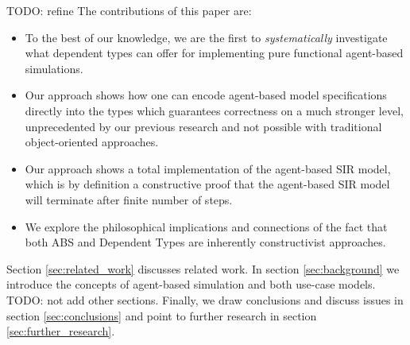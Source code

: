 TODO: refine
The contributions of this paper are:
\begin{itemize}
	\item To the best of our knowledge, we are the first to \textit{systematically} investigate what dependent types can offer for implementing pure functional agent-based simulations.
	\item Our approach shows how one can encode agent-based model specifications directly into the types which guarantees correctness on a much stronger level, unprecedented by our previous research and not possible with traditional object-oriented approaches.
	\item Our approach shows a total implementation of the agent-based SIR model, which is by definition a constructive proof that the agent-based SIR model will terminate after finite number of steps.
	\item We explore the philosophical implications and connections of the fact that both ABS and Dependent Types are inherently constructivist approaches. 
\end{itemize}

Section \ref{sec:related_work} discusses related work. In section \ref{sec:background} we introduce the concepts of agent-based simulation and both use-case models. TODO: not add other sections. Finally, we draw conclusions and discuss issues in section \ref{sec:conclusions} and point to further research in section \ref{sec:further_research}.